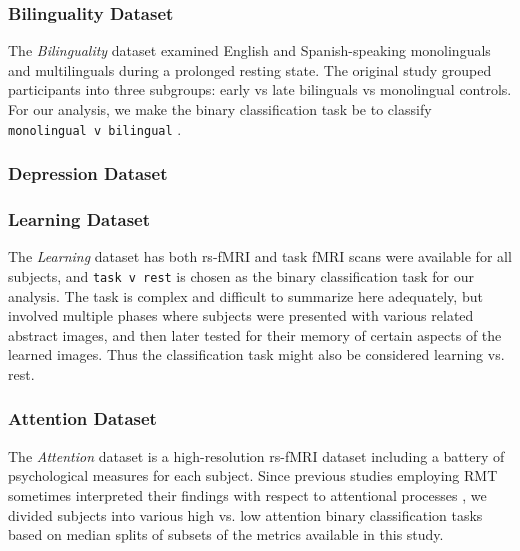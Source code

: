 \documentclass[12pt]{spieman}  %
\newcommand{\code}[1]{\small \texttt{#1} \normalsize}
\begin{document}
\begin{spacing}{2}
\subsubsection{Bilinguality Dataset}

The \textit{Bilinguality} dataset\cite{ds001747:1.0.0,
goldcarrieelizabethExploringRestingState2018} examined English and
Spanish-speaking monolinguals and multilinguals during a prolonged resting
state. The original study grouped participants into three subgroups: early vs
late bilinguals vs monolingual
controls\cite{goldcarrieelizabethExploringRestingState2018}. For our analysis,
we make the binary classification task be to classify \code{monolingual v
bilingual}.


\subsubsection{Depression Dataset}

\subsubsection{Learning Dataset}

The \textit{Learning} dataset\cite{schapiroHumanHippocampalReplay2018,
schapiroHumanHippocampalReplay2020} has both rs-fMRI and task fMRI scans were
available for all subjects, and \code{task v rest} is chosen as the binary
classification task for our analysis.  The task is complex and difficult to
summarize here adequately, but involved multiple phases where subjects were
presented with various related abstract images, and then later tested for their
memory of certain aspects of the learned images. Thus the classification task
might also be considered learning vs. rest.

\subsubsection{Attention Dataset}

The \textit{Attention} dataset\cite{gorgolewskiHighResolution7Tesla2015} is a
high-resolution rs-fMRI dataset including a battery of psychological measures
for each subject. Since previous studies employing RMT sometimes interpreted
their findings with respect to attentional processes
\cite{wangRandomMatrixTheory2016,matharooSpontaneousBackpainAlters2020}, we
divided subjects into various high vs. low attention binary classification
tasks based on median splits of subsets of the metrics available in this study.


\end{spacing}
\end{document}
